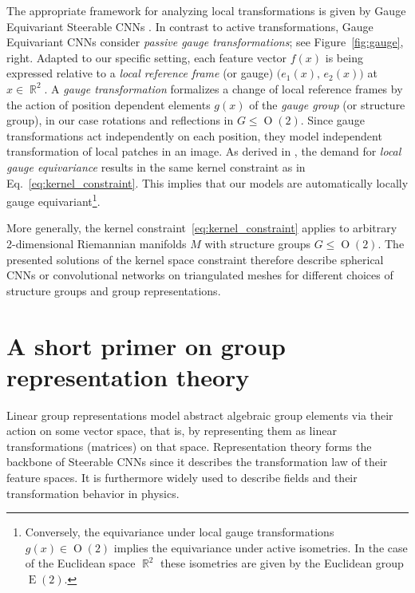 \documentclass{article}
\DeclareMathOperator*{\R}{\mathbb{R}}
\newcommand{\E}[1]{\ensuremath{\operatorname{E}(#1)}}
\renewcommand{\O}[1]{\ensuremath{\operatorname{O}(#1)}}
\begin{document}
The appropriate framework for analyzing local transformations is given by Gauge Equivariant Steerable CNNs \cite{gauge}.
In contrast to active transformations, Gauge Equivariant CNNs consider \emph{passive gauge transformations}; see Figure~\ref{fig:gauge}, right.
Adapted to our specific setting, each feature vector $f(x)$ is being expressed relative to a \emph{local reference frame} (or gauge) $\big(e_1(x),\, e_2(x)\big)$ at $x\in\R^2$.
A \emph{gauge transformation} formalizes a change of local reference frames by the action of position dependent elements $g(x)$ of the \emph{gauge group} (or structure group), in our case rotations and reflections in $G\leq\O2$.
Since gauge transformations act independently on each position, they model independent transformation of local patches in an image.
As derived in \cite{gauge}, the demand for \emph{local gauge equivariance} results in the same kernel constraint as in Eq.~\eqref{eq:kernel_constraint}.
This implies that our models are automatically locally gauge equivariant\footnote{
    Conversely, the equivariance under local gauge transformations $g(x)\!\in\!\O2$ implies the equivariance under active isometries.
    In the case of the Euclidean space $\R^2$ these isometries are given by the Euclidean group $\E2$.
}.

More generally, the kernel constraint~\eqref{eq:kernel_constraint} applies to arbitrary 2-dimensional Riemannian manifolds $M$ with structure groups $G\leq\O2$.
The presented solutions of the kernel space constraint therefore describe spherical CNNs
\cite{Cohen2018-S2CNN,gauge,kondorClebschGordanNets2018,estevesLearningEquivariantRepresentations2018,perraudinDeepSphereEfficientSpherical2018,jiang2019spherical}
or convolutional networks on triangulated meshes
\cite{poulenardMultidirectionalGeodesicNeural2018a,masciGeodesicConvolutionalNeural2015,brunaSpectralNetworksDeep,boscainiLearningClassSpecific2015}
for different choices of structure groups and group representations.

 	
\section{A short primer on group representation theory}
\label{apx:repr_theory}

Linear group representations model abstract algebraic group elements via their action on some vector space, that is, by representing them as linear transformations (matrices) on that space.
Representation theory forms the backbone of Steerable CNNs since it describes the transformation law of their feature spaces.
It is furthermore widely used to describe fields and their transformation behavior in physics.
\end{document}
